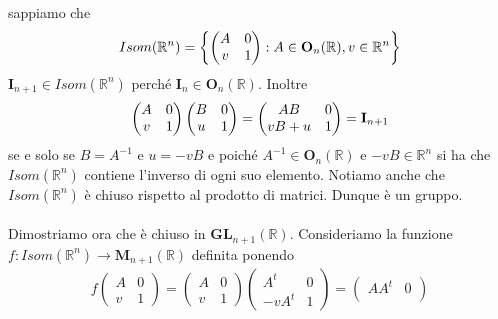 \documentclass[oneside, 11pt]{amsbook}
\makeatletter
\newcommand{\0}{{(0)}}
\newcommand{\3}{{(3)}}
\theoremstyle{colonplain}
\theoremstyle{colondefinition}
\theoremstyle{colonremark}
\numberwithin{equation}{chapter}
\renewcommand{\proofname}{Dimostrazione}
\renewenvironment{proof}[1][\proofname]{\par
  \pushQED{\qed}%
  \normalfont \topsep6\p@\@plus6\p@\relax
  \trivlist
  \item[\hskip\labelsep\bfseries #1:]\ignorespaces
}{%
  \popQED\endtrivlist\@endpefalse
}
\makeatother
\begin{document}
\begin{proof} sappiamo che
\begin{align}
    Isom(\mathbb{R}^n) = \left\{ \begin{pmatrix}
        A & 0 \\
        v & 1
    \end{pmatrix} : A \in \mathbf{O}_n(\mathbb{R}), v \in \mathbb{R}^n \right\} \notag
\end{align}
$\mathbf{I}_{n + 1} \in Isom(\mathbb{R}^n)$ perché $\mathbf{I}_n \in \mathbf{O}_n(\mathbb{R})$. Inoltre
\begin{align}
    \begin{pmatrix}
        A & 0 \\
        v & 1
    \end{pmatrix}
    \begin{pmatrix}
        B & 0 \\
        u & 1
    \end{pmatrix} =
    \begin{pmatrix}
        AB & 0 \\
        vB + u & 1
    \end{pmatrix} =
    \mathbf{I}_{n + 1} \notag
\end{align}
se e solo se $B = A^{-1} \text{ e } u = -vB$ e poiché $A^{-1} \in \mathbf{O}_n(\mathbb{R})$ e $-vB \in \mathbb{R}^n$ si ha che $Isom(\mathbb{R}^n)$ contiene l'inverso di ogni suo elemento. Notiamo anche che $Isom(\mathbb{R}^n)$ è chiuso rispetto al prodotto di matrici. Dunque è un gruppo. \\ \\
Dimostriamo ora che è chiuso in $\mathbf{GL}_{n + 1}(\mathbb{R})$. Consideriamo la funzione \\
$f : Isom(\mathbb{R}^n) \longrightarrow \mathbf{M}_{n + 1}(\mathbb{R})$ definita ponendo
\begin{align}
    f \begin{pmatrix}
        A & 0 \\
        v & 1
    \end{pmatrix} =
    \begin{pmatrix}
        A & 0 \\
        v & 1
    \end{pmatrix}
    \begin{pmatrix}
        A^t & 0 \\
        -vA^t & 1
    \end{pmatrix} =
    \begin{pmatrix}
        AA^t & 0 \\

\end{pmatrix}
\end{align}
\end{proof}
\end{document}
